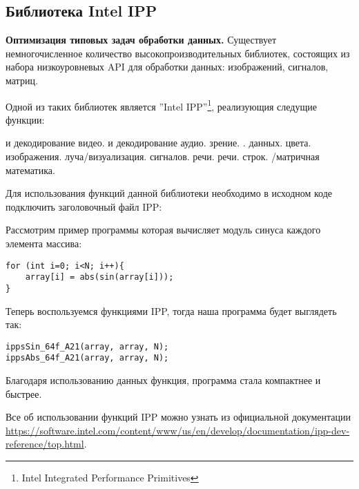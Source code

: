 \subsection{Библиотека Intel IPP}
\label{IPP:section}

\textbf{Оптимизация типовых задач обработки данных.} Существует немногочисленное количество высокопроизводительных библиотек, состоящих из набора низкоуровневых API для обработки данных: изображений, сигналов, матриц.

Одной из таких библиотек является ''Intel IPP''\footnote{Intel Integrated Performance Primitives}, реализующия следущие функции:
\begin{itemize}
     и декодирование видео.
     и декодирование аудио.
     зрение.
    .
     данных.
     цвета.
     изображения.
     луча/визуализация.
     сигналов.
     речи.
     речи.
     строк.
    /матричная математика.
\end{itemize}

Для использования функций данной библиотеки необходимо в исходном коде подключить заголовочный файл IPP: 

Рассмотрим пример программы которая вычисляет модуль синуса каждого элемента массива:

\begin{verbatim}
for (int i=0; i<N; i++){
    array[i] = abs(sin(array[i]));
}
\end{verbatim}

Теперь воспользуемся функциями IPP, тогда наша программа будет выглядеть так:

\begin{verbatim}
ippsSin_64f_A21(array, array, N);
ippsAbs_64f_A21(array, array, N);
\end{verbatim}

Благодаря использованию данных функция, программа стала компактнее и быстрее.

Все об использовании функций IPP можно узнать из официальной документации \url{https://software.intel.com/content/www/us/en/develop/documentation/ipp-dev-reference/top.html}.
